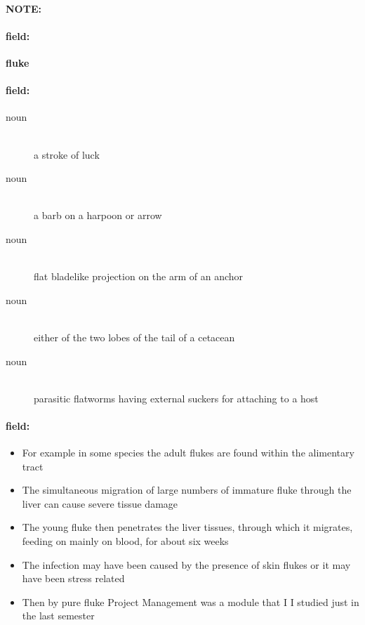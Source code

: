 \documentclass[12pt]{article}
\newenvironment{note}{\paragraph{NOTE:}}{}
\newenvironment{field}{\paragraph{field:}}{}
\begin{document}
\begin{note}
\begin{field}
\textbf{\large fluke}
\end{field}


\begin{field}
\begin{description}
\item[noun] \hfill \\ 
a stroke of luck

\item[noun] \hfill \\ 
a barb on a harpoon or arrow

\item[noun] \hfill \\ 
flat bladelike projection on the arm of an anchor

\item[noun] \hfill \\ 
either of the two lobes of the tail of a cetacean

\item[noun] \hfill \\ 
parasitic flatworms having external suckers for attaching to a host

\end{description}
\end{field}

\begin{field}
\begin{itemize}
\item For example in some species the adult flukes are found within the alimentary tract
\item The simultaneous migration of large numbers of immature fluke through the liver can cause severe tissue damage
\item The young fluke then penetrates the liver tissues, through which it migrates, feeding on mainly on blood, for about six weeks
\item The infection may have been caused by the presence of skin flukes or it may have been stress related
\item Then by pure fluke Project Management was a module that I I studied just in the last semester
\end{itemize}
\end{field}
\end{note}
\end{document}
